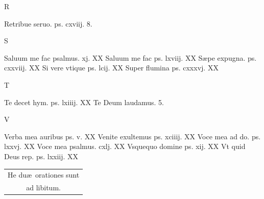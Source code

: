 \documentclass[a5paper,10pt]{book}
\def\ae{æ}
\begin{document}
\begin{multicols}{2}
\begin{center}
\color{red} R
\end{center}
\vspace{-.75em}
\par \noindent Retribue seruo. ps. cxviij. \hfill 8.
\newline \vspace{-1.75em}
\begin{center}
\color{red} S
\end{center}
\vspace{-.75em}
\par \noindent Saluum me fac psalmus. xj. \hfill XX
\newline Saluum me fac ps. lxviij. \hfill XX
\newline S\ae pe expugna. ps. cxxviij. \hfill XX
\newline Si vere vtique ps. lcij. \hfill XX
\newline Super flumina ps. cxxxvj. \hfill XX
\newline \vspace{-1.75em}
\begin{center}
\color{red} T
\end{center}
\vspace{-.75em}
\par \noindent Te decet hym. ps. lxiiij. \hfill XX
\newline Te Deum laudamus. \hfill 5.
\newline \vspace{-1.75em}
\begin{center}
\color{red} V
\end{center}
\vspace{-.75em}
\par \noindent Verba mea auribus ps. v. \hfill XX
\newline Venite exultemus ps. xciiij. \hfill XX%
\newline Voce mea ad do. ps. lxxvj. \hfill XX
\newline Voce mea psalmus. cxlj. \hfill XX
\newline Vsquequo domine ps. xij. \hfill XX
\newline Vt quid Deus rep. ps. lxxiij. \hfill XX
\begin{center}
\begin{tabular}{l r}
\multicolumn{2}{c}{He du\ae \ orationes sunt}\\
\multicolumn{2}{c}{ad libitum.}
\end{tabular}
\end{center}
\end{multicols}
\end{document}
